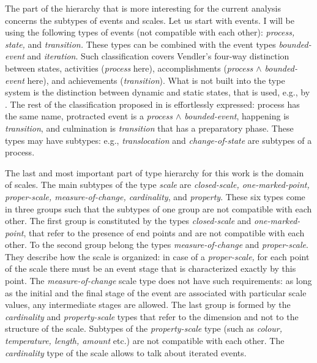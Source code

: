 The part of the hierarchy that is more interesting for the current analysis concerns the subtypes of events and scales. Let us start with events. I will be using the following types of events (not compatible with each other): \textit{process, state,} and \textit{transition.} These types can be combined with the event types \textit{bounded-event} and \textit{iteration}. Such classification covers Vendler's \citep{Vendler:67} four-way distinction between states, activities (\textit{process} here), accomplishments (\textit{process $\wedge$ bounded-event} here), and achievements (\textit{transition}). What is not built into the type system is the distinction between dynamic and static states, that is used, e.g., by \citet{Bach:86}. The rest of the classification proposed in \citealt{Bach:86} is effortlessly expressed: process has the same name, protracted event is a \textit{process $\wedge$ bounded-event}, happening is \textit{transition}, and culmination is \textit{transition} that has a preparatory phase. These types may have subtypes: e.g., \textit{translocation } and \textit{change-of-state} are subtypes of a process.

The last and most important part of type hierarchy for this work is the domain of scales. The main subtypes of the type \textit{scale} are \textit{closed-scale, one-marked-point, proper-scale, measure-of-change, cardinality}, and \textit{property}. These six types come in three groups such that the subtypes of one group are not compatible with each other. The first group is constituted by the types \textit{closed-scale} and \textit{one-marked-point}, that refer to the presence of end points and are not compatible with each other. To the second group belong the types \textit{measure-of-change} and \textit{proper-scale}. They describe how the scale is organized: in case of a \textit{proper-scale,} for each point of the scale there must be an event stage that is characterized exactly by this point. The \textit{measure-of-change} scale type does not have such requirements: as long as the initial and the final stage of the event are associated with particular scale values, any intermediate stages are allowed. The last group is formed by the \textit{cardinality} and \textit{property-scale} types that refer to the dimension and not to the structure of the scale. Subtypes of the \textit{property-scale} type (such as \textit{colour, temperature, length, amount} etc.) are not compatible with each other. The \textit{cardinality} type of the scale allows to talk about iterated events.

